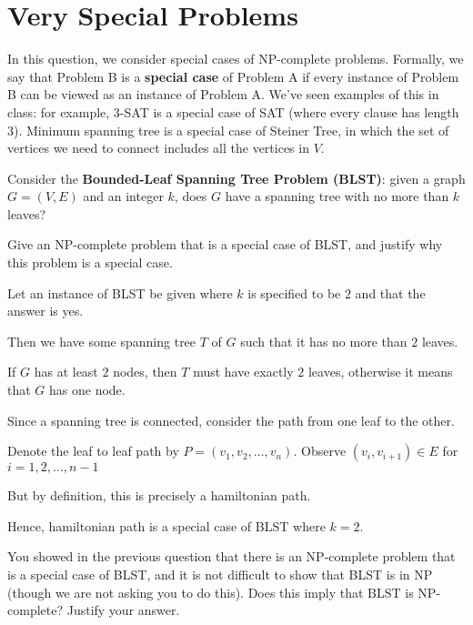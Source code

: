 \section{Very Special Problems}

In this question, we consider special cases of NP-complete problems. Formally, we say that Problem B is a \textbf{special case} of Problem A if every instance of Problem B can be viewed as an instance of Problem A. We've seen examples of this in class: for example, 3-SAT is a special case of SAT (where every clause has length 3). Minimum spanning tree is a special case of Steiner Tree, in which the set of vertices we need to connect includes all the vertices in $V$.

\begin{questions}

	\question[4] Consider the \textbf{Bounded-Leaf Spanning Tree Problem (BLST)}: given a graph $G = (V,E)$ and an integer $k$, does $G$ have a spanning tree with no more than $k$ leaves?

	Give an NP-complete problem that is a special case of BLST, and justify why this problem is a special case.

	\ifsolutions\fi

	\begin{soln}
		Let an instance of BLST be given where \(k\) is specified to be \(2\) and that the answer is yes.

		Then we have some spanning tree \(T\) of \(G\) such that it has no more than \(2\) leaves.

		If \(G\) has at least \(2\) nodes, then \(T\) must have exactly \(2\) leaves, otherwise it means that \(G\) has one node.

		Since a spanning tree is connected, consider the path from one leaf to the other.

		Denote the leaf to leaf path by \(P = (v_1, v_2, \dots, v_n)\). Observe \((v_i, v_{i+1}) \in E\) for \(i = 1, 2, \dots, n -1\)

		But by definition, this is precisely a hamiltonian path.

		Hence, hamiltonian path is a special case of BLST where \(k = 2\).

	\end{soln}

	\question[3] You showed in the previous question that there is an NP-complete problem that is a special case of BLST, and it is not difficult to show that BLST is in NP (though we are not asking you to do this). Does this imply that BLST is NP-complete? Justify your answer.


\end{questions}
